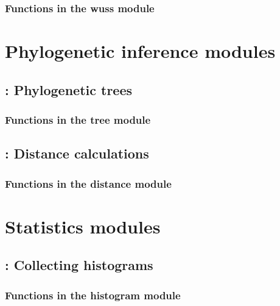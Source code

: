 \documentclass[10pt]{book}
\begin{document}
\subsection{Functions in the wuss module}






\chapter{Phylogenetic inference modules}

\newpage
\section{: Phylogenetic trees}

\subsection{Functions in the tree module}


\newpage
\section{: Distance calculations}

\subsection{Functions in the distance module}







\newpage
\chapter{Statistics modules}


\newpage
\section{: Collecting histograms}

\subsection{Functions in the histogram module}

\end{document}

